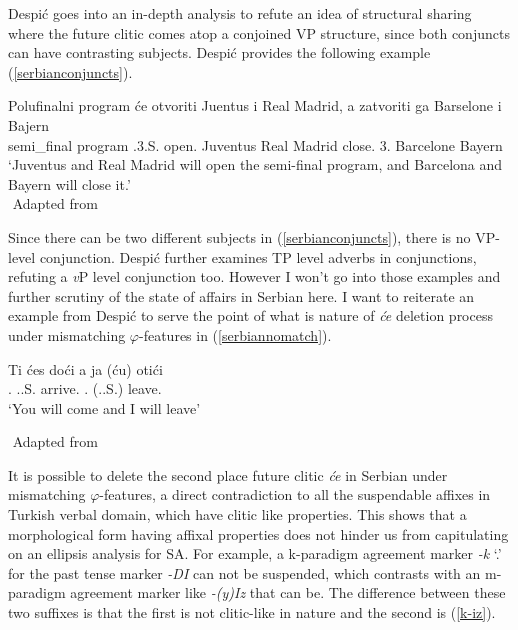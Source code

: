 Despi\'{c} goes into an in-depth analysis to refute an idea of structural sharing where the future clitic comes atop a conjoined VP structure, since both conjuncts can have contrasting subjects. Despi\'c provides the following example (\ref{serbianconjuncts}).

\begin{exe}
    \ex \label{serbianconjuncts}
    \gll 
    Polufinalni program  \'{c}e otvoriti Juentus i {Real Madrid,} a zatvoriti ga Barselone i Bajern \\ semi\_final program {\Aux}.3.S.{\Fut} open.{\Inf} Juventus {\And} {Real Madrid} {\And} close.{\Inf} 3.{\Sg} Barcelone {\And} Bayern \\
    \glt `Juventus and Real Madrid will open the semi-final program, and Barcelona and Bayern will close it.' \\
    ${}$ \hfill Adapted from \cite{despic2017suspended}
\end{exe}

Since there can be two different subjects in (\ref{serbianconjuncts}), there is no VP-level conjunction. Despi\'c further examines TP level adverbs in conjunctions, refuting a \textit{v}P level conjunction too. However I won't go into those examples and further scrutiny of the state of affairs in Serbian here. I want to reiterate an example from Despi\'c to serve the point of what is nature of \textit{\'ce} deletion process under mismatching $\varphi$-features in (\ref{serbiannomatch}).

\begin{exe}
    \ex \label{serbiannomatch}
    \begin{xlist}
        \ex \gll 
        Ti \'{c}es do\'{c}i a ja (\'{c}u) oti\'{c}i \\ {\Second}.{\Sg} {\Aux}.{\Second}.S.{\Fut} arrive.{\Inf} {\And} {\First}.{\Sg} ({\Aux}.{\First}.S.{\Fut}) leave.{\Inf} \\
        \glt `You will come and I will leave'
    \end{xlist}
    ${}$ \hfill Adapted from \cite{despic2017suspended}
\end{exe}

It is possible to delete the second place future clitic \textit{\'ce} in Serbian under mismatching $\varphi$-features, a direct contradiction to all the suspendable affixes in Turkish verbal domain, which have clitic like properties. This shows that a morphological form having affixal properties does not hinder us from capitulating on an ellipsis analysis for SA. For example, a k-paradigm agreement marker \textit{-k} `{\First}.{\Pl}' for the past tense marker \textit{-DI} can not be suspended, which contrasts with an m-paradigm agreement marker like \textit{-(y)Iz} that can be. The difference between these two suffixes is that the first is not clitic-like in nature and the second is (\ref{k-iz}).

